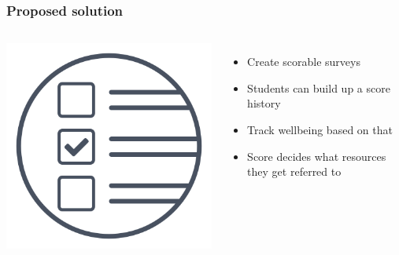 \documentclass{beamer}
\begin{document}
\begin{frame}
    \frametitle{Proposed solution} 
    \begin{columns}
        \includegraphics[width=1\textwidth]{images/icon-actions.png}
        
        \begin{itemize}
            \pause
            \item Create scorable surveys 
            \pause
            \vspace{.2cm}
            \item Students can build up a score history
            \pause
            \vspace{.2cm}
            \item Track wellbeing based on that
            \pause
            \vspace{.2cm}
            \item Score decides what resources they get referred to
        \end{itemize}
    \end{columns}
\end{frame}
\end{document}
